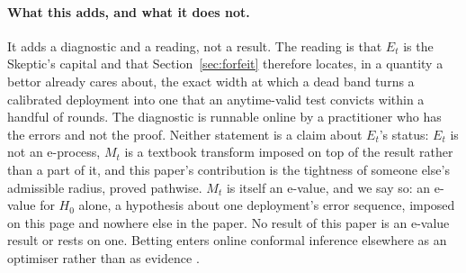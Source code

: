 \paragraph{What this adds, and what it does not.} It adds a diagnostic and a reading, not a result.
The reading is that $E_t$ is the Skeptic's capital and that Section~\ref{sec:forfeit} therefore
locates, in a quantity a bettor already cares about, the exact width at which a dead band turns a
calibrated deployment into one that an anytime-valid test convicts within a handful of rounds. The
diagnostic is runnable online by a practitioner who has the errors and not the proof. Neither
statement is a claim about $E_t$'s status: $E_t$ is not an e-process, $M_t$ is a textbook transform
imposed on top of the result rather than a part of it, and this paper's contribution is the
tightness of someone else's admissible radius, proved pathwise. $M_t$ is itself an e-value, and we
say so: an e-value for $H_0$ alone, a hypothesis about one deployment's error sequence, imposed on
this page and nowhere else in the paper. No result of this paper is an e-value result or rests on
one. Betting enters online conformal inference elsewhere as an optimiser rather than as evidence
\citep{podkopaev2024betting}.

